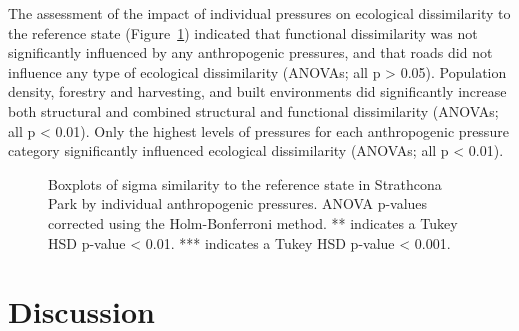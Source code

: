 \documentclass[
]{agujournal2019}
\begin{document}
The assessment of the impact of individual pressures on ecological
dissimilarity to the reference state
(Figure~\ref{fig-boxplot-individual}) indicated that functional
dissimilarity was not significantly influenced by any anthropogenic
pressures, and that roads did not influence any type of ecological
dissimilarity (ANOVAs; all p \textgreater{} 0.05). Population density,
forestry and harvesting, and built environments did significantly
increase both structural and combined structural and functional
dissimilarity (ANOVAs; all p \textless{} 0.01). Only the highest levels
of pressures for each anthropogenic pressure category significantly
influenced ecological dissimilarity (ANOVAs; all p \textless{} 0.01).

\label{cell-fig-boxplot-individual}
\begin{figure}[H]


\caption{\label{fig-boxplot-individual}Boxplots of sigma similarity to
the reference state in Strathcona Park by individual anthropogenic
pressures. ANOVA p-values corrected using the Holm-Bonferroni method. **
indicates a Tukey HSD p-value \textless{} 0.01. *** indicates a Tukey
HSD p-value \textless{} 0.001.}

\end{figure}%

\section{Discussion}\label{discussion}
\end{document}
